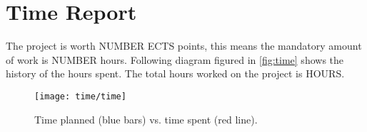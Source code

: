 \chapter{Time Report}
\label{ch:time_report}
The project is worth NUMBER ECTS points, this means the mandatory amount of work is NUMBER hours. Following diagram figured in \autoref{fig:time} shows the history of the hours spent. The total hours worked on the project is HOURS.

\begin{figure}[H]
	\centering
	\texttt{[image: time/time]}
	\caption{Time planned (blue bars) vs. time spent (red line).}
	\label{fig:time}
\end{figure}
